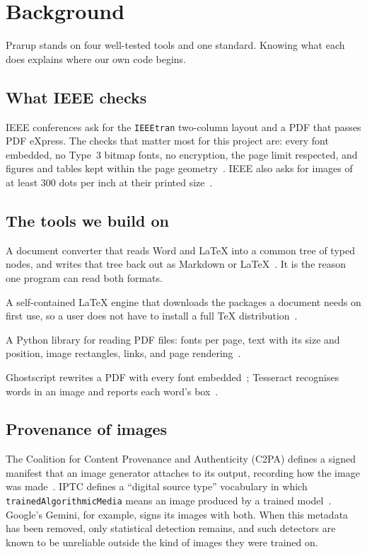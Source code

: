 \documentclass[11pt,a4paper,oneside,openany]{book}
\newcommand{\code}[1]{\texttt{#1}}
\begin{document}
\chapter{Background}\label{ch:bg}

\begin{takeaway}
Prarup stands on four well-tested tools and one standard. Knowing what each does explains where our own
code begins.
\end{takeaway}

\section{What IEEE checks}
IEEE conferences ask for the \code{IEEEtran} two-column layout and a PDF that passes PDF eXpress. The checks
that matter most for this project are: every font embedded, no Type~3 bitmap fonts, no encryption, the page
limit respected, and figures and tables kept within the page geometry~\cite{pdfexpress,ieeetran}. IEEE also
asks for images of at least 300 dots per inch at their printed size~\cite{ieeegraphics}.

\section{The tools we build on}
\begin{description}[style=nextline,leftmargin=2em]
\item[pandoc] A document converter that reads Word and \LaTeX{} into a common tree of typed nodes, and writes
that tree back out as Markdown or \LaTeX~\cite{pandoc}. It is the reason one program can read both formats.
\item[Tectonic] A self-contained \LaTeX{} engine that downloads the packages a document needs on first use,
so a user does not have to install a full \TeX{} distribution~\cite{tectonic}.
\item[PyMuPDF] A Python library for reading PDF files: fonts per page, text with its size and position,
image rectangles, links, and page rendering~\cite{pymupdf}.
\item[Ghostscript and Tesseract] Ghostscript rewrites a PDF with every font embedded~\cite{ghostscript};
Tesseract recognises words in an image and reports each word's box~\cite{tesseract}.
\end{description}

\section{Provenance of images}
The Coalition for Content Provenance and Authenticity (C2PA) defines a signed manifest that an image
generator attaches to its output, recording how the image was made~\cite{c2pa}. IPTC defines a
``digital source type'' vocabulary in which \code{trainedAlgorithmicMedia} means an image produced by a
trained model~\cite{iptc}. Google's Gemini, for example, signs its images with both. When this metadata
has been removed, only statistical detection remains, and such detectors are known to be unreliable outside
the kind of images they were trained on.
\end{document}
